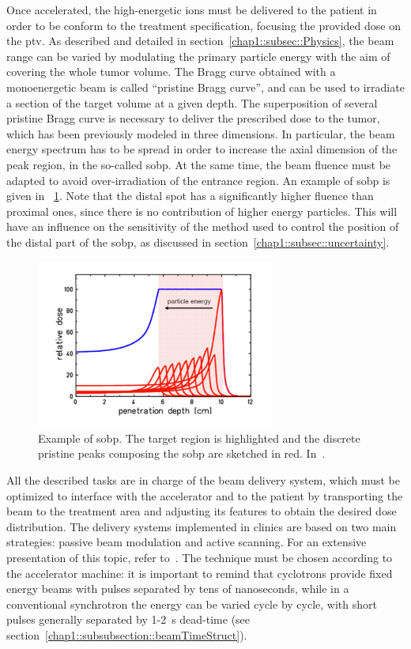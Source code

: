 Once accelerated, the high-energetic ions must be delivered to the patient in order to be conform to the treatment specification, focusing the provided dose on the \gls{ptv}. As described and detailed in section~\ref{chap1::subsec::Physics}, the beam range can be varied by modulating the primary particle energy with the aim of covering the whole tumor volume. The Bragg curve obtained with a monoenergetic beam is called \enquote{pristine Bragg curve}, and can be used to irradiate a section of the target volume at a given depth. The superposition of several pristine Bragg curve is necessary to deliver the prescribed dose to the tumor, which has been previously modeled in three dimensions. In particular, the beam energy spectrum has to be spread in order to increase the axial dimension of the peak region, in the so-called \gls{sobp}. At the same time, the beam fluence must be adapted to avoid over-irradiation of the entrance region. An example of \gls{sobp} is given in \figurename~\ref{chap1::fig::pristine_sobp}. Note that the distal spot has a significantly higher fluence than proximal ones, since there is no contribution of higher energy particles. This will have an influence on the sensitivity of the method used to control the position of the distal part of the \gls{sobp}, as discussed in section~\ref{chap1::subsec::uncertainty}. 

\begin{figure}[!htbp]
\centering
\includegraphics[width=0.7\textwidth]{03_GraphicFiles/chapter1_Introduction/pristine_sobp.pdf}
\caption{Example of \gls{sobp}. The target region is highlighted and the discrete pristine peaks composing the \gls{sobp} are sketched in red. In~\cite{Durante2016}.}
\label{chap1::fig::pristine_sobp}
\end{figure} 

All the described tasks are in charge of the beam delivery system, which must be optimized to interface with the accelerator and to the patient by transporting the beam to the treatment area and adjusting its features to obtain the desired dose distribution. 
The delivery systems implemented in clinics are based on two main strategies: passive beam modulation and active scanning. For an extensive presentation of this topic, refer to~\cite{Gottschalk2008}. The technique must be chosen according to the accelerator machine: it is important to remind that cyclotrons provide fixed energy beams with pulses separated by tens of nanoseconds, while in a conventional synchrotron the energy can be varied cycle by cycle, with short pulses generally separated by 1-2~s dead-time (see section~\ref{chap1::subsubsection::beamTimeStruct}). 

